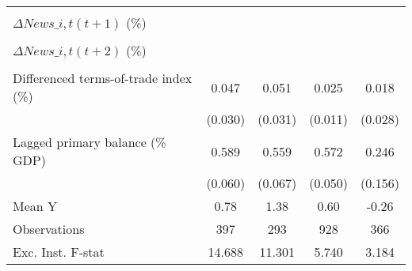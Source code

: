 {\begin{tabular}{l*{4}{c}}
                    &                     &                     &                     &                     \\
\addlinespace
$ \Delta News\_{i,t}(t+1)$ (\%)&                     &                     &                     &                     \\
                    &                     &                     &                     &                     \\
\addlinespace
$ \Delta News\_{i,t}(t+2)$ (\%)&                     &                     &                     &                     \\
                    &                     &                     &                     &                     \\
\addlinespace
Differenced terms-of-trade index (\%)&       0.047         &       0.051         &       0.025\sym{**} &       0.018         \\
                    &     (0.030)         &     (0.031)         &     (0.011)         &     (0.028)         \\
\addlinespace
Lagged primary balance (\% GDP)&       0.589\sym{***}&       0.559\sym{***}&       0.572\sym{***}&       0.246         \\
                    &     (0.060)         &     (0.067)         &     (0.050)         &     (0.156)         \\
\midrule
Mean Y              &        0.78         &        1.38         &        0.60         &       -0.26         \\
Observations        &         397         &         293         &         928         &         366         \\
Exc. Inst. F-stat   &      14.688         &      11.301         &       5.740         &       3.184         \\
\bottomrule
\end{tabular}
}
